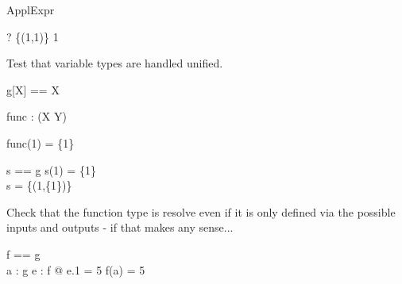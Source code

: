 \begin{zsection}
  \SECTION ApplExpr
\end{zsection}

\begin{zed} \vdash? \{(1,1)\} 1 \in \nat \end{zed}

Test that variable types are handled unified.
\begin{zed}
  g[X] == X
\end{zed}

\begin{gendef}[X,Y]
  func : \power (X \cross Y)
\end{gendef}

\begin{axdef}
\where
  func(1) = \{1\}
\end{axdef}

\begin{axdef}
  s == g
\where
  s(1) = \{1\}\\
  s = \{(1,\{1\})\}
\end{axdef}

Check that the function type is resolve even if it is only defined via 
the possible inputs and outputs - if that makes any sense...
\begin{axdef}
  f == g\\
  a : g
\where
  \exists e : f @ e.1 = 5 \land f(a) = 5
\end{axdef}
